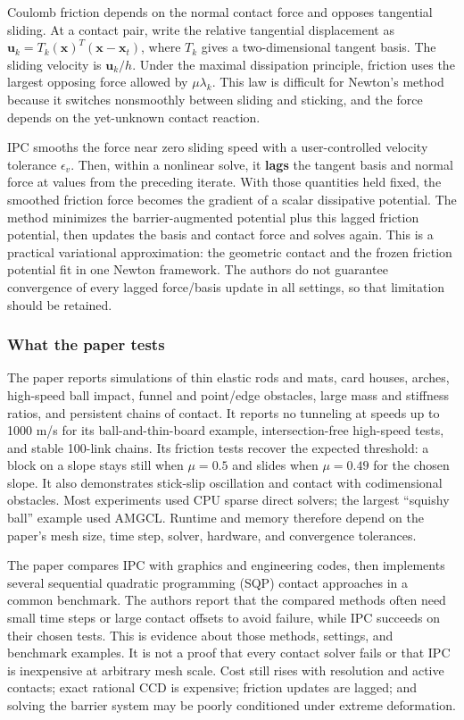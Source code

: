 Coulomb friction depends on the normal contact force and opposes tangential sliding. At a contact pair, write the relative tangential displacement as \(\mathbf{u}_k=T_k(\mathbf{x})^T(\mathbf{x}-\mathbf{x}_t)\), where \(T_k\) gives a two-dimensional tangent basis. The sliding velocity is \(\mathbf{u}_k/h\). Under the maximal dissipation principle, friction uses the largest opposing force allowed by \(\mu\lambda_k\). This law is difficult for Newton's method because it switches nonsmoothly between sliding and sticking, and the force depends on the yet-unknown contact reaction.

IPC smooths the force near zero sliding speed with a user-controlled velocity tolerance \(\epsilon_v\). Then, within a nonlinear solve, it \textbf{lags} the tangent basis and normal force at values from the preceding iterate. With those quantities held fixed, the smoothed friction force becomes the gradient of a scalar dissipative potential. The method minimizes the barrier-augmented potential plus this lagged friction potential, then updates the basis and contact force and solves again. This is a practical variational approximation: the geometric contact and the frozen friction potential fit in one Newton framework. The authors do not guarantee convergence of every lagged force/basis update in all settings, so that limitation should be retained.

\subsubsection{What the paper tests}\label{04-visual-computing-ii-ch029-what-the-paper-tests-1}

The paper reports simulations of thin elastic rods and mats, card houses, arches, high-speed ball impact, funnel and point/edge obstacles, large mass and stiffness ratios, and persistent chains of contact. It reports no tunneling at speeds up to 1000 m/s for its ball-and-thin-board example, intersection-free high-speed tests, and stable 100-link chains. Its friction tests recover the expected threshold: a block on a slope stays still when \(\mu=0.5\) and slides when \(\mu=0.49\) for the chosen slope. It also demonstrates stick-slip oscillation and contact with codimensional obstacles. Most experiments used CPU sparse direct solvers; the largest ``squishy ball'' example used AMGCL. Runtime and memory therefore depend on the paper's mesh size, time step, solver, hardware, and convergence tolerances.

The paper compares IPC with graphics and engineering codes, then implements several sequential quadratic programming (SQP) contact approaches in a common benchmark. The authors report that the compared methods often need small time steps or large contact offsets to avoid failure, while IPC succeeds on their chosen tests. This is evidence about those methods, settings, and benchmark examples. It is not a proof that every contact solver fails or that IPC is inexpensive at arbitrary mesh scale. Cost still rises with resolution and active contacts; exact rational CCD is expensive; friction updates are lagged; and solving the barrier system may be poorly conditioned under extreme deformation.

